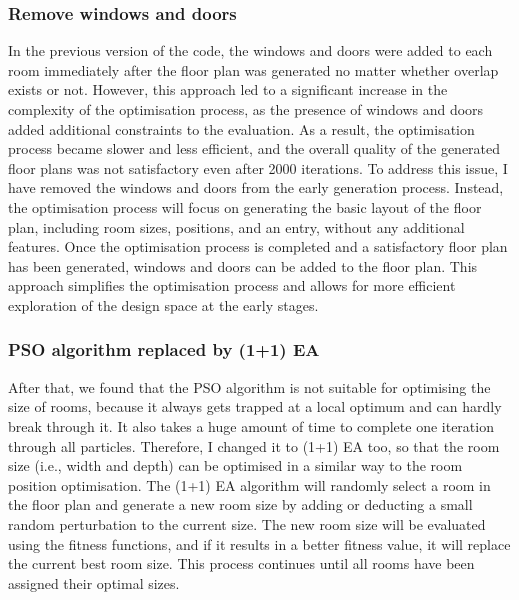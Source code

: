 \documentclass[]{article}
\begin{document}
\subsubsection{Remove windows and doors}
In the previous version of the code, the windows and doors were added to each room immediately after the floor plan was generated no matter whether overlap exists or not. However, this approach led to a significant increase in the complexity of the optimisation process, as the presence of windows and doors added additional constraints to the evaluation. As a result, the optimisation process became slower and less efficient, and the overall quality of the generated floor plans was not satisfactory even after 2000 iterations.
To address this issue, I have removed the windows and doors from the early generation process. Instead, the optimisation process will focus on generating the basic layout of the floor plan, including room sizes, positions, and an entry, without any additional features. Once the optimisation process is completed and a satisfactory floor plan has been generated, windows and doors can be added to the floor plan. This approach simplifies the optimisation process and allows for more efficient exploration of the design space at the early stages.

\subsubsection{PSO algorithm replaced by (1+1) EA}
After that, we found that the PSO algorithm is not suitable for optimising the size of rooms, because it always gets trapped at a local optimum and can hardly break through it. It also takes a huge amount of time to complete one iteration through all particles. Therefore, I changed it to (1+1) EA too, so that the room size (i.e., width and depth) can be optimised in a similar way to the room position optimisation. The (1+1) EA algorithm will randomly select a room in the floor plan and generate a new room size by adding or deducting a small random perturbation to the current size. The new room size will be evaluated using the fitness functions, and if it results in a better fitness value, it will replace the current best room size. This process continues until all rooms have been assigned their optimal sizes.
\end{document}
